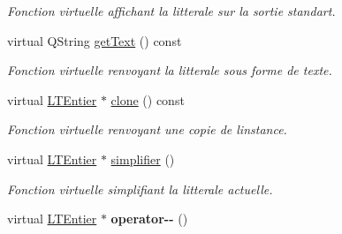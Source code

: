 \begin{DoxyCompactItemize}
\begin{DoxyCompactList}\small\item\em Fonction virtuelle affichant la litterale sur la sortie standart. \end{DoxyCompactList}\item 
virtual Q\+String \hyperlink{class_l_t_entier_a735c05de25b1264a5b2bc603f63eed58}{get\+Text} () const 
\begin{DoxyCompactList}\small\item\em Fonction virtuelle renvoyant la litterale sous forme de texte. \end{DoxyCompactList}\item 
virtual \hyperlink{class_l_t_entier}{L\+T\+Entier} $\ast$ \hyperlink{class_l_t_entier_afc21b025efd3feea0162053902b8d640}{clone} () const 
\begin{DoxyCompactList}\small\item\em Fonction virtuelle renvoyant une copie de l\textquotesingle{}instance. \end{DoxyCompactList}\item 
virtual \hyperlink{class_l_t_entier}{L\+T\+Entier} $\ast$ \hyperlink{class_l_t_entier_a3dd0959762240ef5cbe0a62970728ddf}{simplifier} ()
\begin{DoxyCompactList}\small\item\em Fonction virtuelle simplifiant la litterale actuelle. \end{DoxyCompactList}\item 
virtual \hyperlink{class_l_t_entier}{L\+T\+Entier} $\ast$ {\bfseries operator-\/-\/} ()\hypertarget{class_l_t_entier_a6bae152bbfed3d8035ad1aa03d9202a7}{}\label{class_l_t_entier_a6bae152bbfed3d8035ad1aa03d9202a7}


\end{DoxyCompactItemize}
